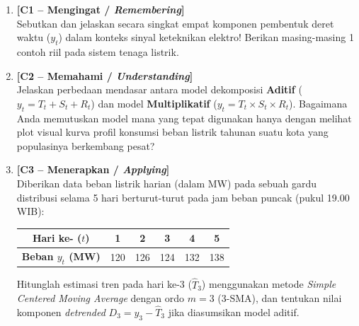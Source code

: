 \documentclass[11pt,a4paper]{article}
\begin{document}
\begin{enumerate}[leftmargin=1.8em, label=\textbf{Soal \arabic*.}]
    
    \item \textbf{[C1 -- Mengingat / \textit{Remembering}]} \\
    Sebutkan dan jelaskan secara singkat empat komponen pembentuk deret waktu ($y_t$) dalam konteks sinyal keteknikan elektro! Berikan masing-masing 1 contoh riil pada sistem tenaga listrik.
    \vspace{2.2cm}

    \item \textbf{[C2 -- Memahami / \textit{Understanding}]} \\
    Jelaskan perbedaan mendasar antara model dekomposisi \textbf{Aditif} ($y_t = T_t + S_t + R_t$) dan model \textbf{Multiplikatif} ($y_t = T_t \times S_t \times R_t$). Bagaimana Anda memutuskan model mana yang tepat digunakan hanya dengan melihat plot visual kurva profil konsumsi beban listrik tahunan suatu kota yang populasinya berkembang pesat?
    \vspace{2.8cm}

    \item \textbf{[C3 -- Menerapkan / \textit{Applying}]} \\
    Diberikan data beban listrik harian (dalam MW) pada sebuah gardu distribusi selama 5 hari berturut-turut pada jam beban puncak (pukul 19.00 WIB):
    \begin{center}
    \begin{tabular}{|c|c|c|c|c|c|}
    \hline
    \textbf{Hari ke- ($t$)} & 1 & 2 & 3 & 4 & 5 \\ \hline
    \textbf{Beban $y_t$ (MW)} & 120 & 126 & 124 & 132 & 138 \\ \hline
    \end{tabular}
    \end{center}
    Hitunglah estimasi tren pada hari ke-3 ($\hat{T}_3$) menggunakan metode \textit{Simple Centered Moving Average} dengan ordo $m = 3$ ($3$-SMA), dan tentukan nilai komponen \textit{detrended} $D_3 = y_3 - \hat{T}_3$ jika diasumsikan model aditif.
    \vspace{2.8cm}

    \newpage


\end{enumerate}
\end{document}
